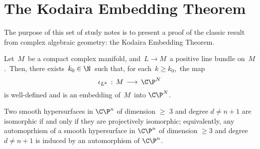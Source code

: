 

\section{The Kodaira Embedding Theorem}
\setcounter{theorem}{0}
\setcounter{equation}{0}


\renewcommand{\theenumi}{\roman{enumi}}
\renewcommand{\labelenumi}{\textnormal{(\theenumi)}$\;\;$}


The purpose of this set of study notes is to present a proof
of the classic result from complex algebraic geometry:
the Kodaira Embedding Theorem.

\begin{theorem}
\mbox{}
\vskip 0.1cm
\noindent
Let \,$M$\, be a compact complex manifold,
and \,$L \longrightarrow M$\, a positive line bundle on \,$M$.\,
Then, there exists \,$k_{0} \in \N$\, such that, for each \,$k \geq k_{0}$,\,
the map
\begin{equation*}
\iota_{L^{k}} \, : \, M \, \longrightarrow \, \C\P^{N}
\end{equation*}
is well-defined and is an embedding of \,$M$\, into $\C\P^{N}$.
\end{theorem}


\begin{theorem}
\mbox{}
\vskip 0.1cm
\noindent
Two smooth hypersurfaces in $\C\P^{n}$
of dimension $\geq$ $3$ and degree $d \neq n + 1$
are isomorphic if and only if they are projectively isomorphic;
equivalently, any automoprhism of a smooth hypersurface
in $\C\P^{n}$ of dimension $\geq 3$ and degree $d \neq n+ 1$
is induced by an automorphism of $\C\P^{n}$.
\end{theorem}

